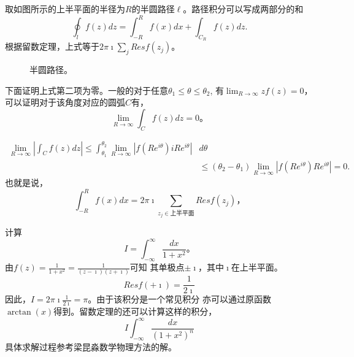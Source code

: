 取如图所示的上半平面的半径为$R$的半圆路径$\ell$。路径积分可以写成两部分的和
\begin{equation}
    \oint_l f(z) d z=\int_{-R}^R f(x) d x+\int_{C_R} f(z) d z .
\end{equation}
根据留数定理，上式等于$2\pi \imath  \sum_j Res f(z_j)$。
%
\begin{figure}[htb!]
    \centering
    
    \caption{半圆路径。}
    \label{fig:semicircle}
\end{figure}
下面证明上式第二项为零。一般的对于任意$\theta_1 \leq \theta \leq \theta_2$, 
有$\lim_{R\to \infty} zf(z) = 0$，可以证明对于该角度对应的圆弧$C$有，
\begin{equation}
    \lim_{R \rightarrow \infty} \int_C f(z) dz = 0 \textrm{。}
\end{equation}

\[
    \begin{aligned}
    \lim _{R \rightarrow \infty}\left|\int_C f(z) d z\right| \leq \int_{\theta_1}^{\theta_2} \lim _{R \rightarrow \infty}\left|f\left(R e^{i \theta}\right) i R e^{i \theta}\right| & d \theta \\
    & \leq\left(\theta_2-\theta_1\right) \lim _{R \rightarrow \infty}\left|f\left(R e^{i \theta}\right) R e^{i \theta}\right|=0 .
    \end{aligned}
\]
也就是说，
\begin{equation}
    \int_{-R}^R f(x) d x = 2\pi \imath  \sum_{z_j\in \textrm{上半平面}} Res f(z_j)，
\end{equation}

\begin{examplebox}{计算\[ 
    I = \int_{-\infty}^{\infty} \frac{dx}{1 + x^2}   \textrm{。}
    \]}
    由$f(z) = \frac{1}{1+ x^2} = \frac{1}{(z-\imath)(z+\imath)}$可知
    其单极点$\pm \imath$，其中$\imath$在上半平面。
    \[
      Res f(+\imath) = \frac{1}{2\imath}  
    \]
    因此，$I = 2\pi \imath  \frac{1}{2\imath} = \pi$。由于该积分是一个常见积分
    亦可以通过原函数$\arctan(x)$得到。留数定理的还可以计算这样的积分，
    \[
      I\int_{-\infty}^{\infty} \frac{dx}{(1 + x^2)^n} 
    \]
    具体求解过程参考梁昆淼数学物理方法的解。
\end{examplebox}


